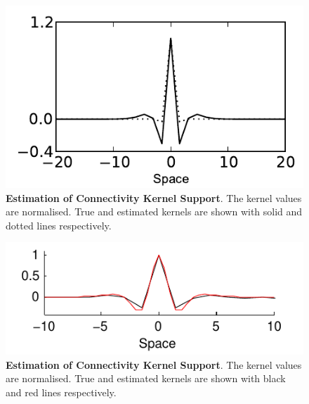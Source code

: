 \documentclass[]{article}
\begin{document}
\begin{figure}[!ht]
\begin{center}
\includegraphics{./Figures/KernelWidthEstimation.pdf}
\end{center}
\caption{{\bf Estimation of Connectivity Kernel Support}. The kernel values are normalised. True  and estimated kernels are shown with solid and dotted lines respectively.}
\label{fig:KernelWidth}
\end{figure}

\begin{figure}[!ht]
\begin{center}
\includegraphics{./Figures/KernelWidthEstimation2.pdf}
\end{center}
\caption{{\bf Estimation of Connectivity Kernel Support}. The kernel values are normalised. True  and estimated kernels are shown with black and red lines respectively.}
\label{fig:KernelWidth2}
\end{figure}

\newpage
\end{document}
